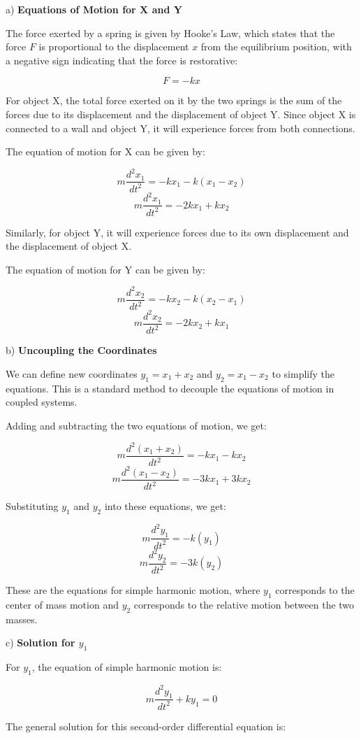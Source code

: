\documentclass[a4paper,11pt]{article}
\begin{document}
a) \textbf{Equations of Motion for X and Y}

The force exerted by a spring is given by Hooke's Law, which states that the force \( F \) is proportional to the displacement \( x \) from the equilibrium position, with a negative sign indicating that the force is restorative:

\[ F = -kx \]

For object X, the total force exerted on it by the two springs is the sum of the forces due to its displacement and the displacement of object Y. Since object X is connected to a wall and object Y, it will experience forces from both connections.

The equation of motion for X can be given by:

\[ m \frac{d^2 x_1}{dt^2} = -kx_1 - k(x_1 - x_2) \]
\[ m \frac{d^2 x_1}{dt^2} = -2kx_1 + kx_2 \]

Similarly, for object Y, it will experience forces due to its own displacement and the displacement of object X.

The equation of motion for Y can be given by:

\[ m \frac{d^2 x_2}{dt^2} = -kx_2 - k(x_2 - x_1) \]
\[ m \frac{d^2 x_2}{dt^2} = -2kx_2 + kx_1 \]

b) \textbf{Uncoupling the Coordinates}

We can define new coordinates \( y_1 = x_1 + x_2 \) and \( y_2 = x_1 - x_2 \) to simplify the equations. This is a standard method to decouple the equations of motion in coupled systems.

Adding and subtracting the two equations of motion, we get:

\[ m \frac{d^2 (x_1 + x_2)}{dt^2} = -kx_1 - kx_2 \]
\[ m \frac{d^2 (x_1 - x_2)}{dt^2} = -3kx_1 + 3kx_2 \]

Substituting \( y_1 \) and \( y_2 \) into these equations, we get:

\[ m \frac{d^2 y_1}{dt^2} = -k(y_1) \]
\[ m \frac{d^2 y_2}{dt^2} = -3k(y_2) \]

These are the equations for simple harmonic motion, where \( y_1 \) corresponds to the center of mass motion and \( y_2 \) corresponds to the relative motion between the two masses.

c) \textbf{Solution for \( y_1 \)}

For \( y_1 \), the equation of simple harmonic motion is:

\[ m \frac{d^2 y_1}{dt^2} + ky_1 = 0 \]

The general solution for this second-order differential equation is:
\end{document}
